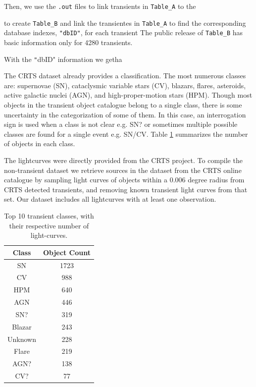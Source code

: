 \documentclass[a4paper,fleqn,usenatbib]{mnras}
\begin{document}
Then, we use the \verb".out" files to link transients in
\verb"Table_A" to the 

to create \verb"Table_B" and link the transientes in \verb"Table_A"
to find the corresponding database indexes, \texttt{"dbID"}, for each transient 
The public release of \verb"Table_B" has basic information only for
4280 transients.  

With the \texttt"dbID" information we getha


The CRTS dataset already provides a classification. 
The most numerous classes are: supernovae (SN),
cataclysmic variable stars (CV), blazars, flares, asteroids, active
galactic nuclei (AGN), and high-proper-motion stars (HPM). 
Though most objects in the transient object catalogue belong to a single class,
there is some uncertainty in the categorization of some of
them. 
In this case, an interrogation sign is used when a class is not clear
e.g. SN? or sometimes multiple possible classes are found for a single
event e.g. SN/CV.
Table \ref{table:top_classes} summarizes the number of objects in
each class. 

The lightcurves were directly provided from the CRTS project.
To compile the non-transient dataset we retrieve sources in the
dataset from the CRTS online catalogue by sampling light curves of
objects within a 0.006  degree radius from CRTS detected transients,
and removing known transient light curves from that set. 
Our dataset includes all lightcurves with at least one observation. 

\begin{table}
\centering
\begin{tabular}{c|c}
    \hline
    Class &  Object Count \\
    \hline
SN & 1723 \\
CV & 988 \\
HPM & 640 \\
AGN & 446 \\
SN? & 319 \\
Blazar & 243 \\
Unknown & 228 \\
Flare & 219 \\
AGN? & 138 \\
CV? & 77 \\
    \hline
\end{tabular}
\caption{Top 10 transient classes, with their respective number of
  light-curves.} 
\label{table:top_classes}
\end{table}
\end{document}
